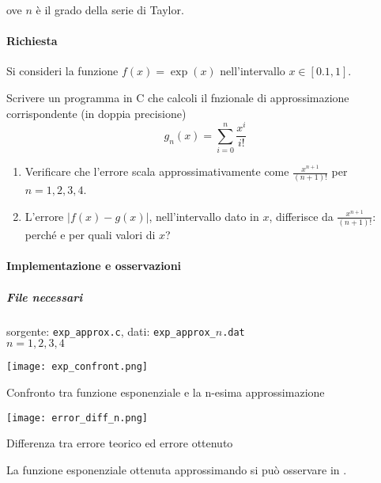 ove $n$ è il grado della serie di Taylor.

\paragraph{Richiesta}

Si consideri la funzione \( f(x) = \exp(x) \) nell'intervallo \( x \in [0.1, 1] \).

Scrivere un programma in C che calcoli il fnzionale di approssimazione corrispondente (in doppia precisione)
\[
g_n(x) = \sum_{i=0}^{n} \frac{x^i}{i!}
\]

\begin{enumerate}
    \item Verificare che l'errore scala approssimativamente come \( \frac{x^{n+1}}{(n+1)!} \) per \( n = 1, 2, 3, 4 \).
    \item L'errore \( \left| f(x) - g(x) \right| \), nell'intervallo dato in \( x \), differisce da \( \frac{x^{n+1}}{(n+1)!} \): perché e per quali valori di \( x \)?
\end{enumerate}


\paragraph{Implementazione e osservazioni}

\subparagraph{File necessari} sorgente: \texttt{exp\_approx.c}, dati: \texttt{exp\_approx\_$n$.dat} \\ $n = 1, 2, 3, 4$

\begin{marginfigure}
    \hspace*{-2cm}
	\texttt{[image: exp\_confront.png]}
	\caption{Confronto tra funzione esponenziale e la n-esima approssimazione}
\end{marginfigure}


\begin{marginfigure}
    \hspace*{-2cm}
	\texttt{[image: error\_diff\_n.png]}
	\caption{Differenza tra errore teorico ed errore ottenuto}
\end{marginfigure}

La funzione esponenziale ottenuta approssimando si può osservare in .

